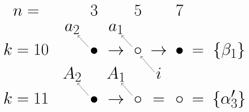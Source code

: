 \documentclass{article}
\begin{document}
\(
\begin{tikzcd}[
nodes={font=\Huge,inner sep=2pt},
row sep=0.3cm,
column sep=0.3cm
]
n= && & 3 & & 5 & & 7 & &  & & \\
&& a_2 && a_1 \\ 
k=10 &&& \bullet\arrow[lu] &\rightarrow& \circ\arrow[lu] &\rightarrow& \bullet &=& \{\beta_1\}  \\ 
&& A_2 && A_1 && i\arrow[lu] \\
k=11 &&& \bullet\arrow[lu] &\rightarrow& \circ\arrow[lu] &=& \circ &=& \{\alpha'_3\} \\ \\
\\
\end{tikzcd}
\)
\end{document}
